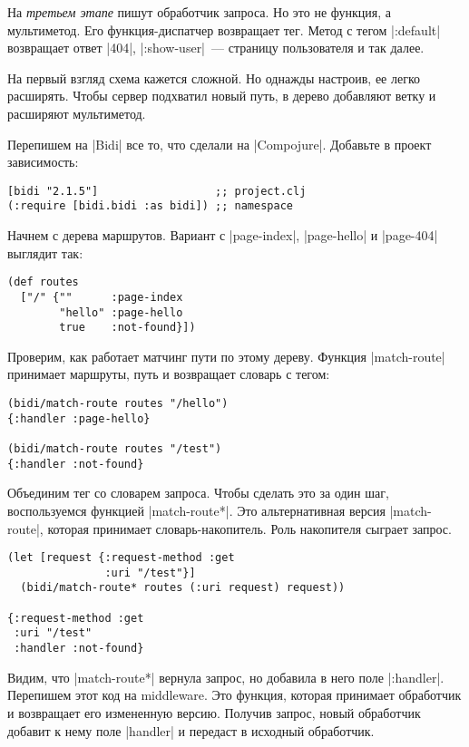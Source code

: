 На \emph{третьем этапе} пишут обработчик запроса. Но это не функция, а мультиметод.
Его функция-диспатчер возвращает тег. Метод с тегом \spverb|:default| возвращает
ответ \spverb|404|, \spverb|:show-user|~--- страницу пользователя и так далее.

На первый взгляд схема кажется сложной. Но однажды настроив, ее легко
расширять. Чтобы сервер подхватил новый путь, в дерево добавляют ветку и
расширяют мультиметод.

Перепишем на \spverb|Bidi| все то, что сделали на \spverb|Compojure|. Добавьте в проект
зависимость:

\begin{verbatim}
[bidi "2.1.5"]                  ;; project.clj
(:require [bidi.bidi :as bidi]) ;; namespace
\end{verbatim}

Начнем с дерева маршрутов. Вариант с \spverb|page-index|, \spverb|page-hello|
и \spverb|page-404| выглядит так:

\begin{verbatim}
(def routes
  ["/" {""      :page-index
        "hello" :page-hello
        true    :not-found}])
\end{verbatim}

Проверим, как работает матчинг пути по этому дереву. Функция \spverb|match-route|
принимает маршруты, путь и возвращает словарь с тегом:

\begin{verbatim}
(bidi/match-route routes "/hello")
{:handler :page-hello}

(bidi/match-route routes "/test")
{:handler :not-found}
\end{verbatim}

Объединим тег со словарем запроса. Чтобы сделать это за один шаг, воспользуемся
функцией \spverb|match-route*|. Это альтернативная версия \spverb|match-route|, которая принимает
словарь-накопитель. Роль накопителя сыграет запрос.

\begin{verbatim}
(let [request {:request-method :get
               :uri "/test"}]
  (bidi/match-route* routes (:uri request) request))

{:request-method :get
 :uri "/test"
 :handler :not-found}
\end{verbatim}

Видим, что \spverb|match-route*| вернула запрос, но добавила в него поле
\spverb|:handler|. Перепишем этот код на middleware. Это функция, которая
принимает обработчик и возвращает его измененную версию. Получив запрос, новый
обработчик добавит к нему поле \spverb|handler| и передаст в исходный
обработчик.

